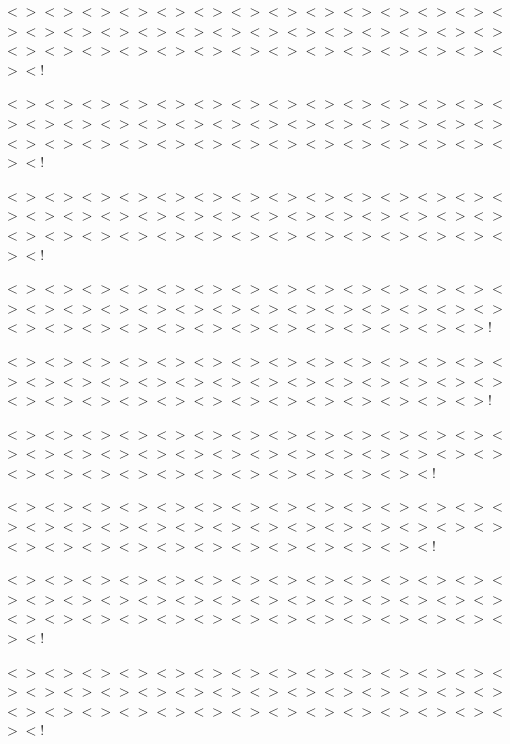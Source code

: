 $<$$>$$<$$>$$<$$>$$<$$>$$<$$>$$<$$>$$<$$>$$<$$>$$<$$>$$<$$>$$<$$>$$<$$>$$<$$>$$<$$>$$<$$>$$<$$>$$<$$>$$<$$>$$<$$>$$<$$>$$<$$>$$<$$>$$<$$>$$<$$>$$<$$>$$<$$>$$<$$>$$<$$>$$<$$>$$<$$>$$<$$>$$<$$>$$<$$>$$<$$>$$<$$>$$<$$>$$<$$>$$<$$>$$<$$>$$<$$>$$<$$>$$<$!

$<$$>$$<$$>$$<$$>$$<$$>$$<$$>$$<$$>$$<$$>$$<$$>$$<$$>$$<$$>$$<$$>$$<$$>$$<$$>$$<$$>$$<$$>$$<$$>$$<$$>$$<$$>$$<$$>$$<$$>$$<$$>$$<$$>$$<$$>$$<$$>$$<$$>$$<$$>$$<$$>$$<$$>$$<$$>$$<$$>$$<$$>$$<$$>$$<$$>$$<$$>$$<$$>$$<$$>$$<$$>$$<$$>$$<$$>$$<$$>$$<$$>$$<$!

$<$$>$$<$$>$$<$$>$$<$$>$$<$$>$$<$$>$$<$$>$$<$$>$$<$$>$$<$$>$$<$$>$$<$$>$$<$$>$$<$$>$$<$$>$$<$$>$$<$$>$$<$$>$$<$$>$$<$$>$$<$$>$$<$$>$$<$$>$$<$$>$$<$$>$$<$$>$$<$$>$$<$$>$$<$$>$$<$$>$$<$$>$$<$$>$$<$$>$$<$$>$$<$$>$$<$$>$$<$$>$$<$$>$$<$$>$$<$$>$$<$$>$$<$!

$<$$>$$<$$>$$<$$>$$<$$>$$<$$>$$<$$>$$<$$>$$<$$>$$<$$>$$<$$>$$<$$>$$<$$>$$<$$>$$<$$>$$<$$>$$<$$>$$<$$>$$<$$>$$<$$>$$<$$>$$<$$>$$<$$>$$<$$>$$<$$>$$<$$>$$<$$>$$<$$>$$<$$>$$<$$>$$<$$>$$<$$>$$<$$>$$<$$>$$<$$>$$<$$>$$<$$>$$<$$>$$<$$>$$<$$>$$<$$>$!

$<$$>$$<$$>$$<$$>$$<$$>$$<$$>$$<$$>$$<$$>$$<$$>$$<$$>$$<$$>$$<$$>$$<$$>$$<$$>$$<$$>$$<$$>$$<$$>$$<$$>$$<$$>$$<$$>$$<$$>$$<$$>$$<$$>$$<$$>$$<$$>$$<$$>$$<$$>$$<$$>$$<$$>$$<$$>$$<$$>$$<$$>$$<$$>$$<$$>$$<$$>$$<$$>$$<$$>$$<$$>$$<$$>$$<$$>$$<$$>$!

$<$$>$$<$$>$$<$$>$$<$$>$$<$$>$$<$$>$$<$$>$$<$$>$$<$$>$$<$$>$$<$$>$$<$$>$$<$$>$$<$$>$$<$$>$$<$$>$$<$$>$$<$$>$$<$$>$$<$$>$$<$$>$$<$$>$$<$$>$$<$$>$$<$$>$$<$$>$$<$$>$$<$$>$$<$$>$$<$$>$$<$$>$$<$$>$$<$$>$$<$$>$$<$$>$$<$$>$$<$$>$$<$$>$$<$!

$<$$>$$<$$>$$<$$>$$<$$>$$<$$>$$<$$>$$<$$>$$<$$>$$<$$>$$<$$>$$<$$>$$<$$>$$<$$>$$<$$>$$<$$>$$<$$>$$<$$>$$<$$>$$<$$>$$<$$>$$<$$>$$<$$>$$<$$>$$<$$>$$<$$>$$<$$>$$<$$>$$<$$>$$<$$>$$<$$>$$<$$>$$<$$>$$<$$>$$<$$>$$<$$>$$<$$>$$<$$>$$<$$>$$<$!

$<$$>$$<$$>$$<$$>$$<$$>$$<$$>$$<$$>$$<$$>$$<$$>$$<$$>$$<$$>$$<$$>$$<$$>$$<$$>$$<$$>$$<$$>$$<$$>$$<$$>$$<$$>$$<$$>$$<$$>$$<$$>$$<$$>$$<$$>$$<$$>$$<$$>$$<$$>$$<$$>$$<$$>$$<$$>$$<$$>$$<$$>$$<$$>$$<$$>$$<$$>$$<$$>$$<$$>$$<$$>$$<$$>$$<$$>$$<$$>$$<$$>$$<$!

$<$$>$$<$$>$$<$$>$$<$$>$$<$$>$$<$$>$$<$$>$$<$$>$$<$$>$$<$$>$$<$$>$$<$$>$$<$$>$$<$$>$$<$$>$$<$$>$$<$$>$$<$$>$$<$$>$$<$$>$$<$$>$$<$$>$$<$$>$$<$$>$$<$$>$$<$$>$$<$$>$$<$$>$$<$$>$$<$$>$$<$$>$$<$$>$$<$$>$$<$$>$$<$$>$$<$$>$$<$$>$$<$$>$$<$$>$$<$$>$$<$$>$$<$! 

